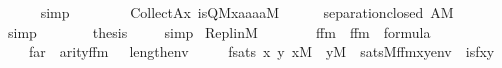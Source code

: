 \begin{isabellebody}
\ \ \ \ \isamarkupfalse%
\ simp\isanewline
\ \ \isamarkupfalse%
\ \isanewline
\ \ \isamarkupfalse%
\ {\isachardoublequoteopen}Collect{\isacharparenleft}{\kern0pt}A{\isacharcomma}{\kern0pt}{\isasymlambda}x{\isachardot}{\kern0pt}\ is{\isacharunderscore}{\kern0pt}Q{\isacharparenleft}{\kern0pt}{\isacharhash}{\kern0pt}{\isacharhash}{\kern0pt}M{\isacharcomma}{\kern0pt}x{\isacharcomma}{\kern0pt}a{}{\isacharcomma}{\kern0pt}a{}{\isacharcomma}{\kern0pt}a{}{\isacharcomma}{\kern0pt}a{}{\isacharparenright}{\kern0pt}{\isacharparenright}{\kern0pt}{\isasymin}M{\isachardoublequoteclose}\isanewline
\ \ \ \ \isamarkupfalse%
\ separation{\isacharunderscore}{\kern0pt}closed\ {\isacartoucheopen}A{\isasymin}M{\isacartoucheclose}\ \isamarkupfalse%
\ simp\ \isanewline
\ \ \isamarkupfalse%
\isanewline
\ \ \isamarkupfalse%
\ {\isacharquery}{\kern0pt}thesis\ \isamarkupfalse%
\ {}\ \isamarkupfalse%
\ simp\isanewline
{}\isamarkupfalse%
%
\endisatagproof
{\isafoldproof}%
%
\isadelimproof
\isanewline
%
\endisadelimproof
\isanewline
{}\isamarkupfalse%
\ Repl{\isacharunderscore}{\kern0pt}in{\isacharunderscore}{\kern0pt}M\ {\isacharcolon}{\kern0pt}\isanewline
\ \ \isanewline
\ \ \ \ f{\isacharunderscore}{\kern0pt}fm{\isacharcolon}{\kern0pt}\ \ {\isachardoublequoteopen}f{\isacharunderscore}{\kern0pt}fm\ {\isasymin}\ formula{\isachardoublequoteclose}\ \isanewline
\ \ \ \ f{\isacharunderscore}{\kern0pt}ar{\isacharcolon}{\kern0pt}\ \ {\isachardoublequoteopen}arity{\isacharparenleft}{\kern0pt}f{\isacharunderscore}{\kern0pt}fm{\isacharparenright}{\kern0pt}{\isasymle}\ {}\ {\isacharhash}{\kern0pt}{\isacharplus}{\kern0pt}\ length{\isacharparenleft}{\kern0pt}env{\isacharparenright}{\kern0pt}{\isachardoublequoteclose}\ \isanewline
\ \ \ \ fsats{\isacharcolon}{\kern0pt}\ {\isachardoublequoteopen}{\isasymAnd}x\ y{\isachardot}{\kern0pt}\ x{\isasymin}M\ {\isasymLongrightarrow}\ y{\isasymin}M\ {\isasymLongrightarrow}\ sats{\isacharparenleft}{\kern0pt}M{\isacharcomma}{\kern0pt}f{\isacharunderscore}{\kern0pt}fm{\isacharcomma}{\kern0pt}{\isacharbrackleft}{\kern0pt}x{\isacharcomma}{\kern0pt}y{\isacharbrackright}{\kern0pt}{\isacharat}{\kern0pt}env{\isacharparenright}{\kern0pt}\ {\isasymlongleftrightarrow}\ is{\isacharunderscore}{\kern0pt}f{\isacharparenleft}{\kern0pt}x{\isacharcomma}{\kern0pt}y{\isacharparenright}{\kern0pt}{\isachardoublequoteclose}\ \isanewline

\end{isabellebody}

